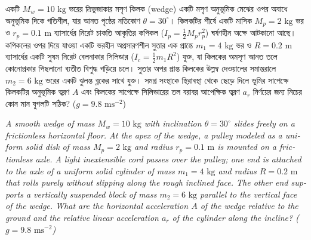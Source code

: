 \documentclass[12pt, a4paper]{article}
\begin{document}
\newpage

\begin{tcolorbox}[questionbox={প্রশ্ন (Question) 3}]
    \noindent
    একটি $M_w = 10\text{ kg}$ ভরের ত্রিভুজাকার মসৃণ কিলক (wedge) একটি মসৃণ অনুভূমিক মেঝের ওপর অবাধে অনুভূমিক দিকে গতিশীল, যার আনত পৃষ্ঠের নতিকোণ $\theta = 30^\circ$। কিলকটির শীর্ষে একটি মাসিক $M_p = 2\text{ kg}$ ভর ও $r_p = 0.1\text{ m}$ ব্যাসার্ধের নিরেট চাকতি আকৃতির কপিকল ($I_p = \frac{1}{2} M_p r_p^2$) ঘর্ষণহীন অক্ষে আটকানো আছে। কপিকলের ওপর দিয়ে যাওয়া একটি ভরহীন অপ্রসারণশীল সুতার এক প্রান্তে $m_1 = 4\text{ kg}$ ভর ও $R = 0.2\text{ m}$ ব্যাসার্ধের একটি সুষম নিরেট বেলনাকার সিলিন্ডার ($I_c = \frac{1}{2} m_1 R^2$) যুক্ত, যা কিলকের অমসৃণ আনত তলে কোনোপ্রকার পিছলানো ব্যতীত বিশুদ্ধ গড়িয়ে চলে। সুতার অপর প্রান্ত কিলকের উল্লম্ব দেওয়ালের সমান্তরালে $m_2 = 6\text{ kg}$ ভরের একটি ঝুলন্ত ব্লকের সাথে যুক্ত। সমগ্র সংস্থাকে স্থিরাবস্থা থেকে ছেড়ে দিলে ভূমির সাপেক্ষে কিলকটির অনুভূমিক ত্বরণ $A$ এবং কিলকের সাপেক্ষে সিলিন্ডারের তল বরাবর আপেক্ষিক ত্বরণ $a_r$ নির্ণয়ের জন্য নিচের কোন মান যুগলটি সঠিক? ($g = 9.8\text{ ms}^{-2}$)
    
    \vspace{0.8em}
    \begin{english}
    \noindent\textit{\color{darkgray}
    A smooth wedge of mass $M_w = 10\text{ kg}$ with inclination $\theta = 30^\circ$ slides freely on a frictionless horizontal floor. At the apex of the wedge, a pulley modeled as a uniform solid disk of mass $M_p = 2\text{ kg}$ and radius $r_p = 0.1\text{ m}$ is mounted on a frictionless axle. A light inextensible cord passes over the pulley; one end is attached to the axle of a uniform solid cylinder of mass $m_1 = 4\text{ kg}$ and radius $R = 0.2\text{ m}$ that rolls purely without slipping along the rough inclined face. The other end supports a vertically suspended block of mass $m_2 = 6\text{ kg}$ parallel to the vertical face of the wedge. What are the horizontal acceleration $A$ of the wedge relative to the ground and the relative linear acceleration $a_r$ of the cylinder along the incline? ($g = 9.8\text{ ms}^{-2}$)
    }
    \end{english}
\end{tcolorbox}
\end{document}
